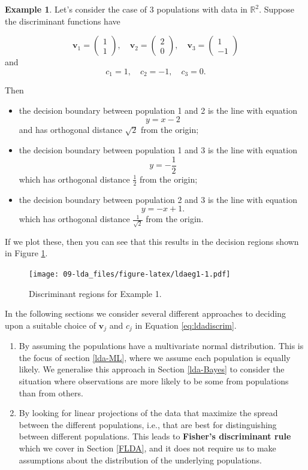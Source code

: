 \documentclass[
]{book}
\theoremstyle{definition}
\theoremstyle{definition}
\newtheorem{example}{Example}[chapter]
\theoremstyle{definition}
\theoremstyle{definition}
\theoremstyle{remark}
\begin{document}
\begin{example}
\protect\hypertarget{exm:ldaex1}{}\label{exm:ldaex1}Let's consider the case of 3 populations with data in \(\mathbb{R}^2\). Suppose the discriminant functions have

\[\mathbf v_1 = \begin{pmatrix}1\\1\end{pmatrix}, \quad \mathbf v_2 = \begin{pmatrix}2\\0\end{pmatrix}, \quad\mathbf v_3 = \begin{pmatrix}1\\-1\end{pmatrix}\]
and
\[c_1=1, \quad c_2=-1, \quad c_3=0.\]

Then

\begin{itemize}
\item
  the decision boundary between population 1 and 2 is the line with equation
  \[y=x-2\]
  and has orthogonal distance \(\sqrt{2}\) from the origin;
\item
  the decision boundary between population 1 and 3 is the line with equation
  \[y=-\frac{1}{2}\]
  which has orthogonal distance \(\frac{1}{2}\) from the origin;
\item
  the decision boundary between population 2 and 3 is the line with equation
  \[y=-x+1.\]
  which has orthogonal distance \(\frac{1}{\sqrt{2}}\) from the origin.
\end{itemize}

If we plot these, then you can see that this results in the decision regions shown in Figure \ref{fig:ldaeg1}.
\end{example}

\begin{figure}
\centering
\texttt{[image: 09-lda\_files/figure-latex/ldaeg1-1.pdf]}
\caption{\label{fig:ldaeg1}Discriminant regions for Example 1.}
\end{figure}

In the following sections we consider several different approaches to deciding upon a suitable choice of \(\mathbf v_j\) and \(c_j\) in Equation \eqref{eq:ldadiscrim}.

\begin{enumerate}
\def\labelenumi{\arabic{enumi}.}
\item
  By assuming the populations have a multivariate normal distribution. This is the focus of section \ref{lda-ML}, where we assume each population is equally likely. We generalise this approach in Section \ref{lda-Bayes} to consider the situation where observations are more likely to be some from populations than from others.
\item
  By looking for linear projections of the data that maximize the spread between the different populations, i.e., that are best for distinguishing between different populations. This leads to \textbf{Fisher's discriminant rule} which we cover in Section \ref{FLDA}, and it does not require us to make assumptions about the distribution of the underlying populations.
\end{enumerate}
\end{document}
